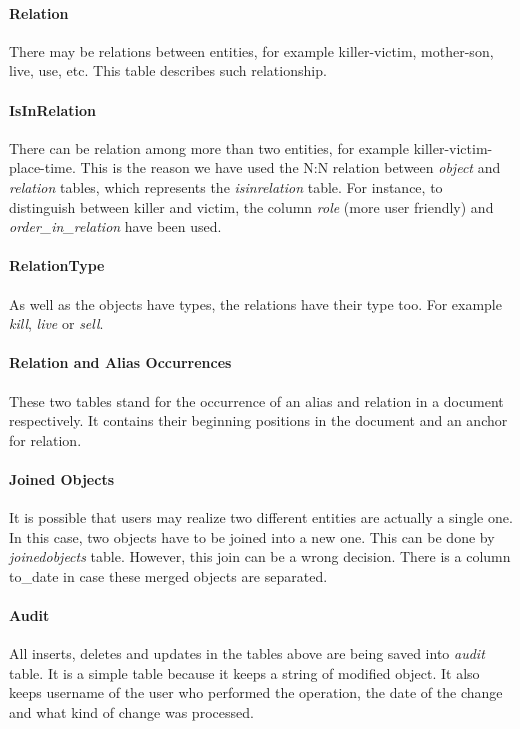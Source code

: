 \paragraph{Relation} There may be relations between entities, for example killer-victim,
mother-son, live, use, etc. This table describes such relationship. 

\paragraph{IsInRelation} There can be relation among more than two entities, for example 
killer-victim-place-time. This is the reason we have used the N:N relation 
between \emph{object} and \emph{relation} tables, which represents the \emph{isinrelation} 
table. For instance, to distinguish between killer and victim, the column \emph{role} 
(more user friendly) and \emph{order\_{}in\_{}relation} have been used.

\paragraph{RelationType} As well as the objects have types, the relations have their type too. 
For example \emph{kill}, \emph{live} or \emph{sell}.

\paragraph{Relation and Alias Occurrences} These two tables stand for the occurrence of an 
alias and relation in a document respectively. It contains their beginning positions in the document 
and an anchor for relation. 

\paragraph{Joined Objects} It is possible that users may realize two different entities are actually 
a single one. In this case, two objects have to be joined into a new one. This can be done by 
\emph{joinedobjects} table. However, this join can be a wrong decision. There is a column 
to\_{}date in case these merged objects are separated.

\paragraph{Audit} All inserts, deletes and updates in the tables above are being saved into \emph{audit} 
table. It is a simple table because it keeps a string of modified object. It also 
keeps username of the user who performed the operation, the date of the change and what kind 
of change was processed.
 
